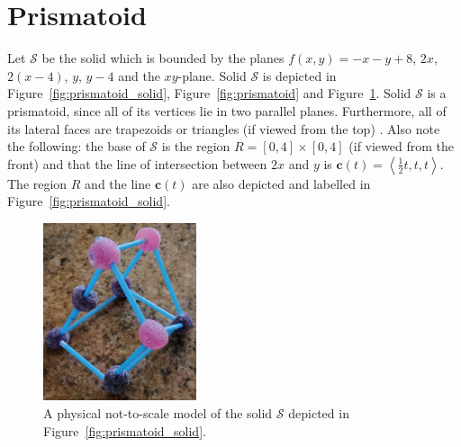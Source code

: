 \documentclass{article}
\theoremstyle{theorem}
\theoremstyle{definition}
\begin{document}
\section{Prismatoid}
Let $\mathcal{S}$ be the solid which is bounded by the planes $f(x,y)=-x-y+8$, $2x$, $2(x-4)$, $y$, $y-4$ and the $xy$-plane. Solid $\mathcal{S}$ is depicted 
in Figure~\ref{fig:prismatoid_solid}, Figure~\ref{fig:prismatoid} and Figure~\ref{fig:prismatoid_real}. Solid $\mathcal{S}$ is a prismatoid, since all of its 
vertices lie in two parallel planes. Furthermore, all of its lateral faces are trapezoids or triangles (if viewed from the top) \cite{bradley1979}. Also note the following: the base of $\mathcal{S}$ is the region 
 $R = [0,4]\times [0,4]$ (if viewed from the front) and that the line of intersection between $2x$ and $y$ is $\mathbf{c}(t) = \left<\frac{1}{2}t,t,t\right>$. The region $R$ and the line $\mathbf{c}(t)$ are
also depicted and labelled in Figure~\ref{fig:prismatoid_solid}.\\

\begin{figure}[htb]
\centering
\includegraphics[width=0.4\textwidth]{prismatoid_real.jpg}
\caption{A physical not-to-scale model of the solid $\mathcal{S}$ depicted in Figure~\ref{fig:prismatoid_solid}.}
\label{fig:prismatoid_real}
\end{figure}
\end{document}

